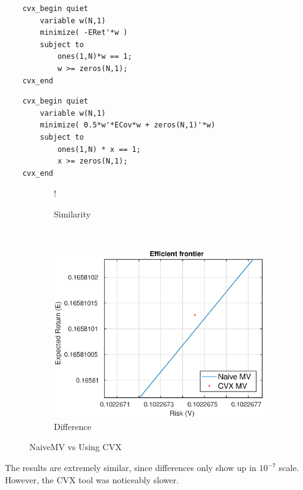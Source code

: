 \documentclass[11pt]{article}
\begin{document}
\vspace{0.5cm}

\begin{minipage}{.4\textwidth}
  	\begin{verbatim}
	cvx_begin quiet
		variable w(N,1)
		minimize( -ERet'*w )
		subject to
			ones(1,N)*w == 1;
			w >= zeros(N,1);
	cvx_end
	\end{verbatim}
\end{minipage}%
\begin{minipage}{.6\textwidth}
  	\begin{verbatim}
	cvx_begin quiet
		variable w(N,1)
		minimize( 0.5*w'*ECov*w + zeros(N,1)'*w)
		subject to
			ones(1,N) * x == 1;
			x >= zeros(N,1);
	cvx_end
	\end{verbatim}
\end{minipage}

\begin{figure}[!h]
    \centering 
   \begin{subfigure}[b]{0.30\textwidth}
     	\resizebox {\textwidth} {!} { }
     \caption{Similarity}
    \label{fig:q1-d-naive-v-cvx}
    \end{subfigure}
    ~
    \begin{subfigure}[b]{0.30\textwidth}
       	\includegraphics[scale=.5] {q1_d_naive_v_cvx_difference.eps}
       \caption{Difference}
        \label{fig:q1-d-naive-v-cvx-difference}
    \end{subfigure}
    \caption{NaiveMV vs Using CVX}\label{fig:naive_v_cvx}
\end{figure}

The results are extremely similar, since differences only show up in $10^{-7}$ scale. However, the
CVX tool was noticeably slower.
\end{document}
